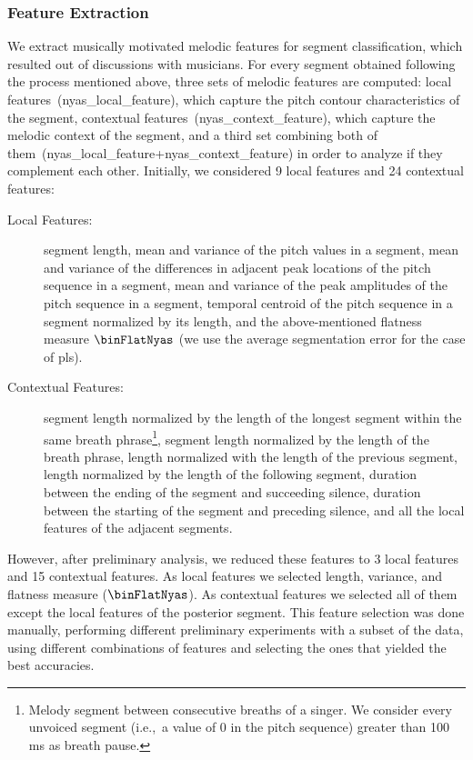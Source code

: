{\subsubsection{Feature Extraction}
\label{sec:pro_processing_nyas_segmentation_feature_extraction}

We extract musically motivated melodic features for segment classification, which resulted out of discussions with musicians. For every segment obtained following the process mentioned above, three sets of melodic features are computed: local features~(\acrshort{nyas_local_feature}), which capture the pitch contour characteristics of the segment, contextual features~(\acrshort{nyas_context_feature}), which capture the melodic context of the segment, and a third set combining both of them~(\acrshort{nyas_local_feature}+\acrshort{nyas_context_feature}) in order to analyze if they complement each other. Initially, we considered 9 local features and 24 contextual features:

\begin{description}
	\item[Local Features:] segment length, mean and variance of the pitch values in a segment, mean and variance of the differences in adjacent peak locations of the pitch sequence in a segment, mean and variance of the  peak amplitudes of the pitch sequence in a segment, temporal centroid of the pitch sequence in a segment normalized by its length, and the above-mentioned flatness measure $\binFlatNyas$ (we use the average segmentation error for the case of \gls{pls}).
	\item[Contextual Features:] segment length normalized by the length of the longest segment within the same breath phrase\footnote{Melody segment between consecutive breaths of a singer. We consider every unvoiced segment (i.e.,~a value of 0 in the pitch sequence) greater than 100\,ms as breath pause.}, segment length normalized by the length of the breath phrase, length normalized with the length of the previous segment, length normalized by the length of the following segment, duration between the ending of the segment and succeeding silence, duration between the starting of the segment and preceding silence, and all the local features of the adjacent segments.
\end{description}

However, after preliminary analysis, we reduced these features to 3 local features and 15 contextual features. As local features we selected length, variance, and flatness measure ($\binFlatNyas$). As contextual features we selected all of them except the local features of the posterior segment. This feature selection was done manually, performing different preliminary experiments with a subset of the data, using different combinations of features and selecting the ones that yielded the best accuracies.

}
